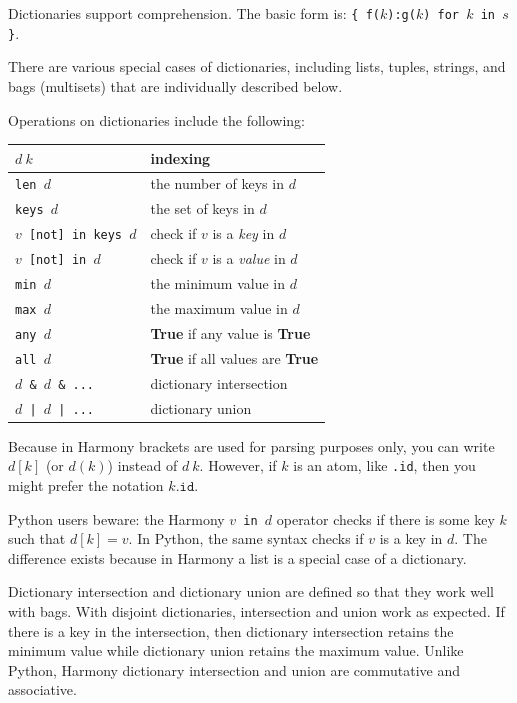 \documentclass{report}
\begin{document}
Dictionaries support comprehension.  The basic form is:
\texttt{\{ f($k$):g($k$) for $k$ in $s$ \}}.

There are various special cases of dictionaries,
including lists, tuples, strings,
and bags (multisets) that are individually described below.

Operations on dictionaries include the following:

\begin{center}
\begin{tabular}{|l|l|}
\hline
\texttt{$d~k$} & indexing \\
\hline
\texttt{len $d$} & the number of keys in $d$ \\
\hline
\texttt{keys $d$} & the set of keys in $d$ \\
\hline
\texttt{$v$ [not] in keys $d$} & check if $v$ is a \emph{key} in $d$ \\
\hline
\texttt{$v$ [not] in $d$} & check if $v$ is a \emph{value} in $d$ \\
\hline
\texttt{min $d$} & the minimum value in $d$ \\
\hline
\texttt{max $d$} & the maximum value in $d$ \\
\hline
\texttt{any $d$} & \textbf{True} if any value is \textbf{True} \\
\hline
\texttt{all $d$} & \textbf{True} if all values are \textbf{True} \\
\hline
\texttt{$d$ \& $d$ \& ...} & dictionary intersection \\
\hline
\texttt{$d$ | $d$ | ...} & dictionary union \\
\hline
\end{tabular}
\end{center}

Because in Harmony brackets are used for parsing purposes only,
you can write $d[k]$ (or $d(k)$) instead of $d~k$.
However, if $k$ is an atom, like \texttt{.id}, then you might
prefer the notation $k\mathtt{.id}$.

Python users beware: the Harmony \texttt{$v$ in $d$} operator checks
if there is some key $k$ such that $d[k] = v$.  In Python, the same
syntax checks if $v$ is a key in $d$.  The difference exists because
in Harmony a list is a special case of a dictionary.

Dictionary intersection and dictionary union are defined so that
they work well with bags.  With disjoint dictionaries, intersection
and union work as expected.  If there is a key in the intersection, then
dictionary intersection retains the minimum value while dictionary
union retains the maximum value.  Unlike Python, Harmony
dictionary intersection and union are commutative and associative.
\end{document}
